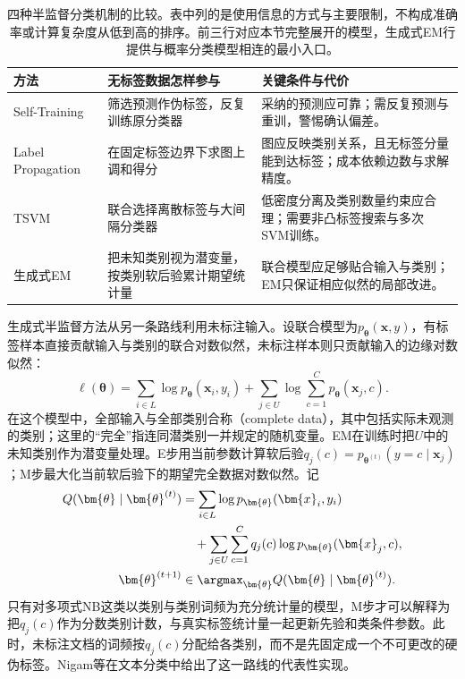 \begin{table}[htbp]
  \centering
  \small
  \begin{tabularx}{\linewidth}{@{}>{\RaggedRight\arraybackslash}p{25mm}>{\RaggedRight\arraybackslash}X>{\RaggedRight\arraybackslash}X@{}}
    \toprule
    方法 & 无标签数据怎样参与 & 关键条件与代价 \\
    \midrule
    Self-Training & 筛选预测作伪标签，反复训练原分类器 & 采纳的预测应可靠；需反复预测与重训，警惕确认偏差。 \\
    Label Propagation & 在固定标签边界下求图上调和得分 & 图应反映类别关系，且无标签分量能到达标签；成本依赖边数与求解精度。 \\
    TSVM & 联合选择离散标签与大间隔分类器 & 低密度分离及类别数量约束应合理；需要非凸标签搜索与多次SVM训练。 \\
    生成式EM & 把未知类别视为潜变量，按类别软后验累计期望统计量 & 联合模型应足够贴合输入与类别；EM只保证相应似然的局部改进。 \\
    \bottomrule
  \end{tabularx}
  \caption{四种半监督分类机制的比较。表中列的是使用信息的方式与主要限制，不构成准确率或计算复杂度从低到高的排序。前三行对应本节完整展开的模型，生成式EM行提供与概率分类模型相连的最小入口。}
  \label{tab:classification-semisupervised-comparison}
\end{table}

生成式半监督方法从另一条路线利用未标注输入。设联合模型为$p_{\bm{\theta}}(\bm{x},y)$，有标签样本直接贡献输入与类别的联合对数似然，未标注样本则只贡献输入的边缘对数似然：
\[
  \ell(\bm{\theta})
  =\sum_{i\in L}\log p_{\bm{\theta}}(\bm{x}_i,y_i)
   +\sum_{j\in U}\log\sum_{c=1}^{C}
      p_{\bm{\theta}}(\bm{x}_j,c).
\]
在这个模型中，全部输入与全部类别合称（complete data），其中包括实际未观测的类别；这里的“完全”指连同潜类别一并规定的随机变量。EM在训练时把$U$中的未知类别作为潜变量处理。E步用当前参数计算软后验$q_j(c)=p_{\bm{\theta}^{(t)}}(y=c\mid\bm{x}_j)$；M步最大化当前软后验下的期望完全数据对数似然。记
\[
  \begin{aligned}
    Q(\bm{\theta}\mid\bm{\theta}^{(t)})
    &=
    \sum_{i\in L}\log p_{\bm{\theta}}(\bm{x}_i,y_i) \\
    &\quad+
    \sum_{j\in U}\sum_{c=1}^{C}
      q_j(c)\log p_{\bm{\theta}}(\bm{x}_j,c), \\
    \bm{\theta}^{(t+1)}
    &\in\argmax_{\bm{\theta}}
      Q(\bm{\theta}\mid\bm{\theta}^{(t)}).
  \end{aligned}
\]
只有对多项式NB这类以类别与类别词频为充分统计量的模型，M步才可以解释为把$q_j(c)$作为分数类别计数，与真实标签统计量一起更新先验和类条件参数。此时，未标注文档的词频按$q_j(c)$分配给各类别，而不是先固定成一个不可更改的硬伪标签。Nigam等在文本分类中给出了这一路线的代表性实现。

